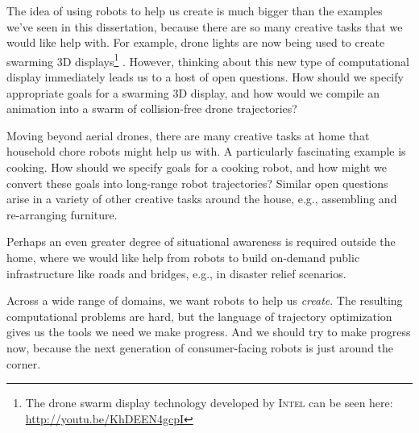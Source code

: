 The idea of using robots to help us create is much bigger than the examples we've seen in this dissertation, because there are so many creative tasks that we would like help with.
For example, drone lights are now being used to create swarming 3D displays\footnote{The drone swarm display technology developed by \textsc{Intel} can be seen here: \url{http://youtu.be/KhDEEN4gcpI}} \cite{intel:2018}.
However, thinking about this new type of computational display immediately leads us to a host of open questions.
How should we specify appropriate goals for a swarming 3D display, and how would we compile an animation into a swarm of collision-free drone trajectories?

Moving beyond aerial drones, there are many creative tasks at home that household chore robots might help us with.
A particularly fascinating example is cooking. 
How should we specify goals for a cooking robot, and how might we convert these goals into long-range robot trajectories?
Similar open questions arise in a variety of other creative tasks around the house, e.g., assembling and re-arranging furniture.

Perhaps an even greater degree of situational awareness is required outside the home, where we would like help from robots to build on-demand public infrastructure like roads and bridges, e.g., in disaster relief scenarios.

Across a wide range of domains, we want robots to help us \emph{create}.
The resulting computational problems are hard, but the language of trajectory optimization gives us the tools we need we make progress.
And we should try to make progress now, because the next generation of consumer-facing robots is just around the corner.

